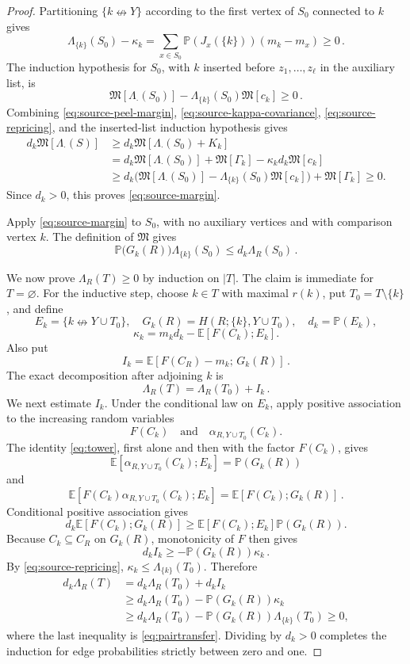 \documentclass[11pt]{article}
\theoremstyle{definition}
\theoremstyle{remark}
\newcommand{\PP}{\mathbb P}
\newcommand{\EE}{\mathbb E}
\newcommand{\ncon}{\nleftrightarrow}
\newcommand{\Marg}{\mathfrak M}
\begin{document}
\begin{proof}
Partitioning $\{k\ncon Y\}$ according to the first vertex of $S_0$ connected to $k$ gives
\begin{equation}\label{eq:source-repricing}
 \Lambda_{\{k\}}(S_0)-\kappa_k
 =\sum_{x\in S_0}\PP(J_x(\{k\}))(m_k-m_x)\geq0\,.
\end{equation}
The induction hypothesis for $S_0$, with $k$ inserted before
$z_1,\ldots,z_\ell$ in the auxiliary list, is
\[
 \Marg[\Lambda_\cdot(S_0)]
 -\Lambda_{\{k\}}(S_0)\Marg[c_k]\geq0\,.
\]
Combining \eqref{eq:source-peel-margin}, \eqref{eq:source-kappa-covariance},
\eqref{eq:source-repricing}, and the inserted-list induction hypothesis gives
\[
\begin{aligned}
 d_k\Marg[\Lambda_\cdot(S)]
 &\geq d_k\Marg[\Lambda_\cdot(S_0)+K_k]\\
 &=d_k\Marg[\Lambda_\cdot(S_0)]
   +\Marg[\Gamma_k]-\kappa_kd_k\Marg[c_k]\\
 &\geq d_k\bigl(\Marg[\Lambda_\cdot(S_0)]
   -\Lambda_{\{k\}}(S_0)\Marg[c_k]\bigr)
   +\Marg[\Gamma_k]\geq0.
\end{aligned}
\]
Since $d_k>0$, this proves \eqref{eq:source-margin}.

Apply \eqref{eq:source-margin} to $S_0$, with no auxiliary vertices and with comparison
vertex $k$. The definition of $\Marg$ gives
\begin{equation}\label{eq:pairtransfer}
 \PP\bigl(G_k(R)\bigr)\Lambda_{\{k\}}(S_0)
 \leq d_k\Lambda_R(S_0)\,.
\end{equation}

We now prove $\Lambda_R(T)\geq0$ by induction on $|T|$. The claim is immediate for
$T=\varnothing$. For the inductive step, choose $k\in T$ with maximal $r(k)$, put
$T_0=T\setminus\{k\}$, and define
\[
 E_k=\{k\ncon Y\cup T_0\},\quad
 G_k(R)=H(R;\{k\},Y\cup T_0),\quad d_k=\PP(E_k),
\]
\[
 \kappa_k=m_kd_k-\EE[F(C_k);E_k].
\]
Also put
\[
 I_k=\EE[F(C_R)-m_k;\,G_k(R)]\,.
\]
The exact decomposition after adjoining $k$ is
\[
 \Lambda_R(T)=\Lambda_R(T_0)+I_k\,.
\]
We next estimate $I_k$. Under the conditional law on $E_k$, apply positive association
to the increasing random variables
\[
 F(C_k)\quad\text{and}\quad \alpha_{R,Y\cup T_0}(C_k).
\]
The identity
\eqref{eq:tower}, first alone and then with the factor $F(C_k)$, gives
\[
 \EE[\alpha_{R,Y\cup T_0}(C_k);E_k]=\PP(G_k(R))
\]
and
\[
 \EE[F(C_k)\alpha_{R,Y\cup T_0}(C_k);E_k]
   =\EE[F(C_k);G_k(R)]\,.
\]
Conditional positive association gives
\[
 d_k\EE[F(C_k);G_k(R)]
 \geq \EE[F(C_k);E_k]\PP(G_k(R)).
\]
Because $C_k\subseteq C_R$ on $G_k(R)$, monotonicity of $F$ then gives
\[
 d_k I_k\geq-\PP(G_k(R))\kappa_k\,.
\]
By \eqref{eq:source-repricing}, $\kappa_k\leq\Lambda_{\{k\}}(T_0)$. Therefore
\[
\begin{aligned}
 d_k\Lambda_R(T)
 &=d_k\Lambda_R(T_0)+d_kI_k\\
 &\geq d_k\Lambda_R(T_0)-\PP(G_k(R))\kappa_k\\
 &\geq d_k\Lambda_R(T_0)
   -\PP(G_k(R))\Lambda_{\{k\}}(T_0)\geq0,
\end{aligned}
\]
where the last inequality is \eqref{eq:pairtransfer}. Dividing by $d_k>0$ completes the
induction for edge probabilities strictly between zero and one.


\end{proof}
\end{document}
